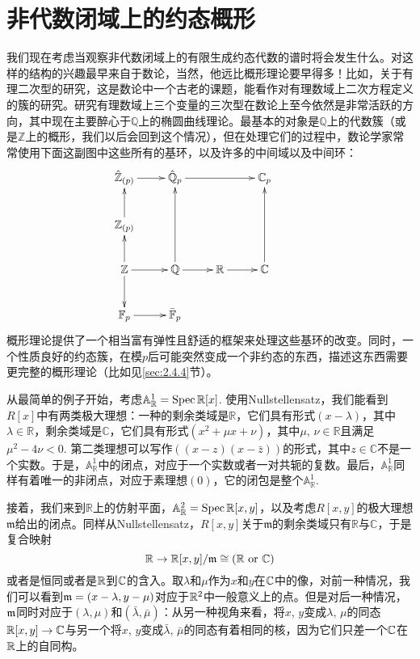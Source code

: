\section{非代数闭域上的约态概形}

我们现在考虑当观察非代数闭域上的有限生成约态代数的谱时将会发生什么。对这样的结构的兴趣最早来自于数论，当然，他远比概形理论要早得多！比如，关于有理二次型的研究，这是数论中一个古老的课题，能看作对有理数域上二次方程定义的簇的研究。研究有理数域上三个变量的三次型在数论上至今依然是非常活跃的方向，其中现在主要醉心于$\mathbb{Q}$上的椭圆曲线理论。最基本的对象是$\mathbb{Q}$上的代数簇（或是$\mathbb{Z}$上的概形，我们以后会回到这个情况），但在处理它们的过程中，数论学家常常使用下面这副图中这些所有的基环，以及许多的中间域以及中间环：
\[
\begin{xy}
	\xymatrix{
		\hat{\mathbb{Z}}_{(p)}\ar[r]&\hat{\mathbb{Q}}_{p}\ar[rr]&&\mathbb{C}_p\\
		\mathbb{Z}_{(p)}\ar[u]&&&\\
		\mathbb{Z}\ar[u]\ar[r]\ar[d]&\mathbb{Q}\ar[r]\ar[uu]&\mathbb{R}\ar[r]&\mathbb{C}\ar[uu]\\
		\mathbb{F}_p\ar[r]&\bar{\mathbb{F}}_p&&&
	}
\end{xy}
\]
概形理论提供了一个相当富有弹性且舒适的框架来处理这些基环的改变。同时，一个性质良好的约态簇，在模$p$后可能突然变成一个非约态的东西，描述这东西需要更完整的概形理论（比如见\ref{sec:2.4.4}节）。

从最简单的例子开始，考虑$\mathbb{A}_{\mathbb{R}}^1=\operatorname{Spec} \mathbb{R}[x]$. 使用Nullstellensatz，我们能看到$R[x]$中有两类极大理想：一种的剩余类域是$\mathbb{R}$，它们具有形式$(x-\lambda)$，其中$\lambda\in\mathbb{R}$，剩余类域是$\mathbb{C}$，它们具有形式$(x^2+\mu x+\nu)$，其中$\mu$, $\nu\in\mathbb{R}$且满足$\mu^2-4\nu<0$. 第二类理想可以写作$((x-z)(x-\bar{z}))$的形式，其中$z\in \mathbb{C}$不是一个实数。于是，$\mathbb{A}_{\mathbb{R}}^1$中的闭点，对应于一个实数或者一对共轭的复数。最后，$\mathbb{A}_{\mathbb{R}}^1$同样有着唯一的非闭点，对应于素理想$(0)$，它的闭包是整个$\mathbb{A}_{\mathbb{R}}^1$.

接着，我们来到$\mathbb{R}$上的仿射平面，$\mathbb{A}_{\mathbb{R}}^2=\operatorname{Spec} \mathbb{R}[x,y]$，以及考虑$R[x,y]$的极大理想$\mathfrak{m}$给出的闭点。同样从Nullstellensatz，$R[x,y]$关于$\mathfrak{m}$的剩余类域只有$\mathbb{R}$与$\mathbb{C}$，于是复合映射
\[
	\mathbb{R}\to \mathbb{R}[x,y]/\mathfrak{m}\cong (\mathbb{R} \text{ or } \mathbb{C})
\]
或者是恒同或者是$\mathbb{R}$到$\mathbb{C}$的含入。取$\lambda$和$\mu$作为$x$和$y$在$\mathbb{C}$中的像，对前一种情况，我们可以看到$\mathfrak{m}=(x-\lambda,y-\mu)$对应于$\mathbb{R}^2$中一般意义上的点。但是对后一种情况，$\mathfrak{m}$同时对应于$(\lambda,\mu)$和$(\bar\lambda,\bar\mu)$：从另一种视角来看，将$x$, $y$变成$\lambda$, $\mu$的同态$\mathbb{R}[x,y]\to \mathbb{C}$与另一个将$x$, $y$变成$\bar\lambda$, $\bar\mu$的同态有着相同的核，因为它们只差一个$\mathbb{C}$在$\mathbb{R}$上的自同构。

